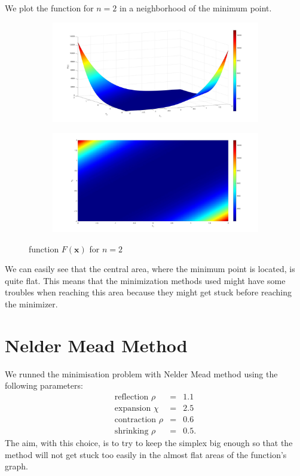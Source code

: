 We plot the function for $n=2$ in a neighborhood of the minimum point.
\begin{figure}[H]
    \centering
    \begin{subfigure}{0.45\textwidth}
        \centering
        \includegraphics[width=\textwidth]{img/function_pb75_angolo1.jpg}
        \caption{}
    \end{subfigure}
    \begin{subfigure}{0.45\textwidth}
        \centering
        \includegraphics[width=\textwidth]{img/function_pb75_angolo2.jpg}
        \caption{}
    \end{subfigure}
    \caption{function $F(\boldsymbol{x})$ for $n=2$}
\label{fig:funzione 2D pb 75}
\end{figure}
We can easily see that the central area, where the minimum point is located,
is quite flat. This means that the minimization methods used might have some troubles
when reaching this area because they might get stuck before reaching the minimizer.

\section*{Nelder Mead Method}
We runned the minimisation problem with Nelder Mead method using the following parameters:
\begin{eqnarray*}
    \text{reflection } \rho &=& 1.1 \\
    \text{expansion } \chi &=& 2.5 \\
    \text{contraction } \rho &=& 0.6 \\
    \text{shrinking } \rho &=& 0.5.
\end{eqnarray*}
The aim, with this choice, is to try to keep the simplex big enough so that
the method will not get stuck too easily in the almost flat areas of the function's graph.

